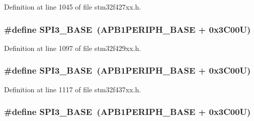 Definition at line 1045 of file stm32f427xx.\+h.

\subsubsection[{\texorpdfstring{S\+P\+I3\+\_\+\+B\+A\+SE}{SPI3_BASE}}]{\setlength{\rightskip}{0pt plus 5cm}\#define S\+P\+I3\+\_\+\+B\+A\+SE~({\bf A\+P\+B1\+P\+E\+R\+I\+P\+H\+\_\+\+B\+A\+SE} + 0x3\+C00\+U)}\hypertarget{group___peripheral__memory__map_gae634fe8faa6922690e90fbec2fc86162}{}\label{group___peripheral__memory__map_gae634fe8faa6922690e90fbec2fc86162}


Definition at line 1097 of file stm32f429xx.\+h.

\subsubsection[{\texorpdfstring{S\+P\+I3\+\_\+\+B\+A\+SE}{SPI3_BASE}}]{\setlength{\rightskip}{0pt plus 5cm}\#define S\+P\+I3\+\_\+\+B\+A\+SE~({\bf A\+P\+B1\+P\+E\+R\+I\+P\+H\+\_\+\+B\+A\+SE} + 0x3\+C00\+U)}\hypertarget{group___peripheral__memory__map_gae634fe8faa6922690e90fbec2fc86162}{}\label{group___peripheral__memory__map_gae634fe8faa6922690e90fbec2fc86162}


Definition at line 1117 of file stm32f437xx.\+h.

\subsubsection[{\texorpdfstring{S\+P\+I3\+\_\+\+B\+A\+SE}{SPI3_BASE}}]{\setlength{\rightskip}{0pt plus 5cm}\#define S\+P\+I3\+\_\+\+B\+A\+SE~({\bf A\+P\+B1\+P\+E\+R\+I\+P\+H\+\_\+\+B\+A\+SE} + 0x3\+C00\+U)}\hypertarget{group___peripheral__memory__map_gae634fe8faa6922690e90fbec2fc86162}{}\label{group___peripheral__memory__map_gae634fe8faa6922690e90fbec2fc86162}


